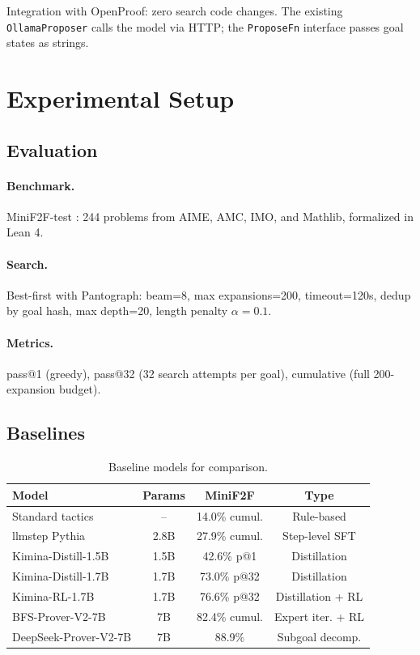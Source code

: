\documentclass[11pt,a4paper]{article}
\begin{document}
Integration with OpenProof: zero search code changes. The existing \texttt{OllamaProposer} calls the model via HTTP; the \texttt{ProposeFn} interface passes goal states as strings.

\section{Experimental Setup}
\label{sec:experiments}

\subsection{Evaluation}

\paragraph{Benchmark.} MiniF2F-test \citep{minif2f}: 244 problems from AIME, AMC, IMO, and Mathlib, formalized in Lean 4.

\paragraph{Search.} Best-first with Pantograph: beam=8, max expansions=200, timeout=120s, dedup by goal hash, max depth=20, length penalty $\alpha{=}0.1$.

\paragraph{Metrics.} pass@1 (greedy), pass@32 (32 search attempts per goal), cumulative (full 200-expansion budget).

\subsection{Baselines}

\begin{table}[h]
\centering
\caption{Baseline models for comparison.}
\begin{tabular}{lccc}
\toprule
\textbf{Model} & \textbf{Params} & \textbf{MiniF2F} & \textbf{Type} \\
\midrule
Standard tactics & -- & 14.0\% cumul. & Rule-based \\
llmstep Pythia & 2.8B & 27.9\% cumul. & Step-level SFT \\
Kimina-Distill-1.5B & 1.5B & 42.6\% p@1 & Distillation \\
Kimina-Distill-1.7B & 1.7B & 73.0\% p@32 & Distillation \\
Kimina-RL-1.7B & 1.7B & 76.6\% p@32 & Distillation + RL \\
\midrule
BFS-Prover-V2-7B & 7B & 82.4\% cumul. & Expert iter. + RL \\
DeepSeek-Prover-V2-7B & 7B & 88.9\% & Subgoal decomp. \\
\bottomrule
\end{tabular}
\label{tab:baselines}
\end{table}
\end{document}
